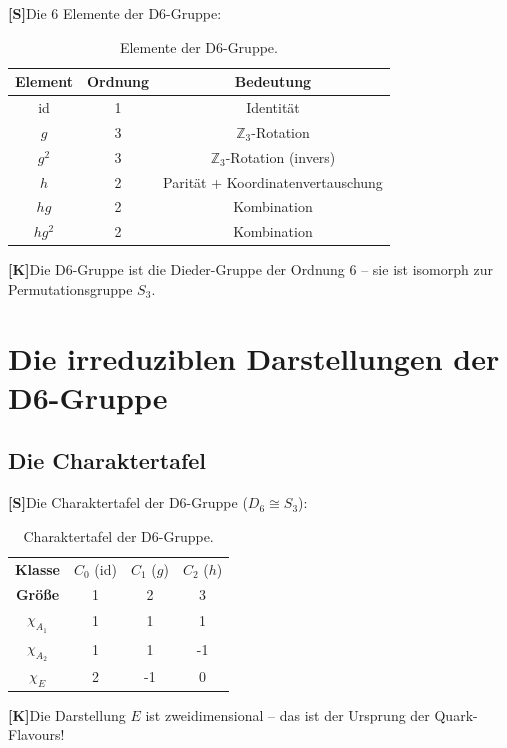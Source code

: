 \documentclass[11pt,a4paper]{article}
\newcommand{\Kstatus}{\textbf{[K]}}
\newcommand{\Sstatus}{\textbf{[S]}}
\begin{document}
	\Sstatus Die 6 Elemente der D6-Gruppe:
	
	\begin{table}[h!]
		\centering
		\caption{Elemente der D6-Gruppe.}
		\label{tab:d6_elements}
		\begin{tabular}{c c c}
			\toprule
			\textbf{Element} & \textbf{Ordnung} & \textbf{Bedeutung} \\
			\midrule
			id & 1 & Identität \\
			$g$ & 3 & $\mathbb{Z}_3$-Rotation \\
			$g^2$ & 3 & $\mathbb{Z}_3$-Rotation (invers) \\
			$h$ & 2 & Parität + Koordinatenvertauschung \\
			$hg$ & 2 & Kombination \\
			$hg^2$ & 2 & Kombination \\
			\bottomrule
		\end{tabular}
	\end{table}
	
	\Kstatus Die D6-Gruppe ist die Dieder-Gruppe der Ordnung 6 -- sie ist isomorph zur Permutationsgruppe $S_3$.
	
	\section{Die irreduziblen Darstellungen der D6-Gruppe}
	
	\subsection{Die Charaktertafel}
	
	\Sstatus Die Charaktertafel der D6-Gruppe ($D_6 \cong S_3$):
	
	\begin{table}[h!]
		\centering
		\caption{Charaktertafel der D6-Gruppe.}
		\label{tab:d6_characters}
		\begin{tabular}{c c c c}
			\toprule
			\textbf{Klasse} & $C_0$ (id) & $C_1$ ($g$) & $C_2$ ($h$) \\
			\textbf{Größe} & 1 & 2 & 3 \\
			\midrule
			$\chi_{A_1}$ & 1 & 1 & 1 \\
			$\chi_{A_2}$ & 1 & 1 & -1 \\
			$\chi_E$ & 2 & -1 & 0 \\
			\bottomrule
		\end{tabular}
	\end{table}
	
	\Kstatus Die Darstellung $E$ ist zweidimensional -- das ist der Ursprung der Quark-Flavours!
	
\end{document}
